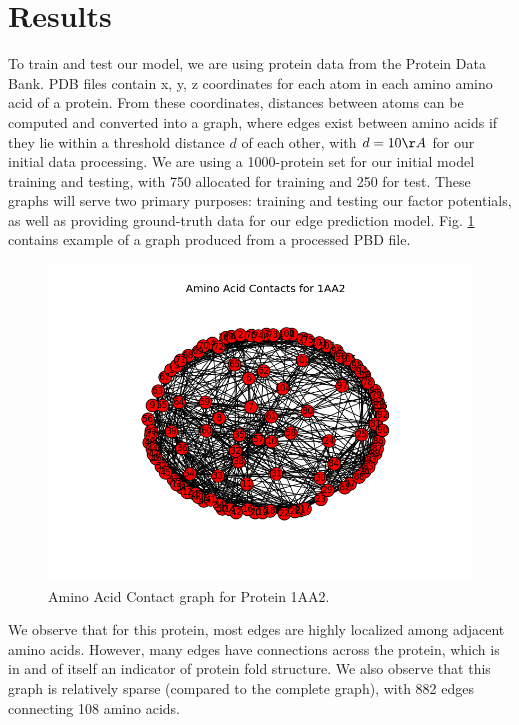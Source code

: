 \documentclass{article}
\begin{document}


\section{Results}
To train and test our model, we are using protein data from the Protein Data Bank. PDB files contain x, y, z coordinates for each atom in each amino amino acid of a protein. From these coordinates, distances between atoms can be computed and converted into a graph, where edges exist between amino acids if they lie within a threshold distance $d$ of each other, with $d = 10 {\AA}$ for our initial data processing. We are using a 1000-protein set for our initial model training and testing, with 750 allocated for training and 250 for test. These graphs will serve two primary purposes: training and testing our factor potentials, as well as providing ground-truth data for our edge prediction model. Fig. \ref{fig:contactgraph} contains example of a graph produced from a processed PBD file. 

\begin{figure}[H]
\centering
\includegraphics[scale=0.3]{1aa2_plot.png}
\caption{Amino Acid Contact graph for Protein 1AA2.}
\label{fig:contactgraph}
\end{figure}
 
We observe that for this protein, most edges are highly localized among adjacent amino acids. However, many edges have connections across the protein, which is in and of itself an indicator of protein fold structure. We also observe that this graph is relatively sparse (compared to the complete graph), with 882 edges connecting 108 amino acids. 
\end{document}
